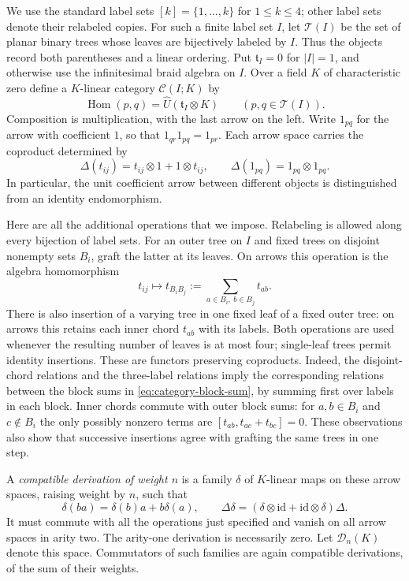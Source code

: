 \documentclass[11pt]{article}
\theoremstyle{definition}
\theoremstyle{remark}
\numberwithin{equation}{section}
\begin{document}
We use the standard label sets $[k]=\{1,\ldots,k\}$ for
$1\leq k\leq4$; other label sets denote their relabeled copies.
For such a finite label set $I$, let
$\mathcal T(I)$ be the set of planar binary trees whose leaves are
bijectively labeled by $I$.  Thus the objects record both parentheses and
a linear ordering.  Put $\mathfrak t_I=0$ for $|I|=1$, and otherwise use
the infinitesimal braid algebra on $I$.  Over a field $K$ of
characteristic zero define a $K$-linear category $\mathcal C(I;K)$ by
\[
 \operatorname{Hom}(p,q)=\widehat U(\mathfrak t_I\otimes K)
 \qquad(p,q\in\mathcal T(I)).
\]
Composition is multiplication, with the last arrow on the left.  Write
$1_{pq}$ for the arrow with coefficient $1$, so that
$1_{qr}1_{pq}=1_{pr}$.  Each arrow space carries the coproduct determined
by
\[
 \Delta(t_{ij})=t_{ij}\otimes1+1\otimes t_{ij},
 \qquad \Delta(1_{pq})=1_{pq}\otimes1_{pq}.
\]
In particular, the unit coefficient arrow between different objects is
distinguished from an identity endomorphism.

Here are all the additional operations that we impose.  Relabeling is
allowed along every bijection of label sets.  For an outer tree on $I$
and fixed trees on disjoint nonempty sets $B_i$, graft the latter at its
leaves.  On arrows this operation is the algebra homomorphism
\begin{equation}\label{eq:category-block-sum}
 t_{ij}\longmapsto t_{B_iB_j}:=
 \sum_{a\in B_i,\ b\in B_j}t_{ab}.
\end{equation}
There is also insertion of a varying tree in one fixed leaf of a fixed
outer tree: on arrows this retains each inner chord $t_{ab}$ with its
labels.  Both operations are used whenever the resulting number of
leaves is at most four; single-leaf trees permit identity insertions.
These are functors preserving coproducts.  Indeed, the disjoint-chord
relations and the three-label relations imply the corresponding
relations between the block sums in
\eqref{eq:category-block-sum}, by summing first over labels in each
block.  Inner chords commute with outer block sums: for
$a,b\in B_i$ and $c\notin B_i$ the only possibly nonzero terms are
$[t_{ab},t_{ac}+t_{bc}]=0$.  These observations also show that successive
insertions agree with grafting the same trees in one step.

A \emph{compatible derivation of weight $n$} is a family $\delta$ of
$K$-linear maps on these arrow spaces, raising weight by $n$, such that
\[
 \delta(ba)=\delta(b)a+b\delta(a),\qquad
 \Delta\delta=(\delta\otimes\mathrm{id}+\mathrm{id}\otimes\delta)\Delta.
\]
It must commute with all the operations just specified and vanish on
all arrow spaces in arity two.  The arity-one derivation is necessarily
zero.  Let $\mathcal D_n(K)$ denote this space.  Commutators of such
families are again compatible derivations, of the sum of their weights.
\end{document}

